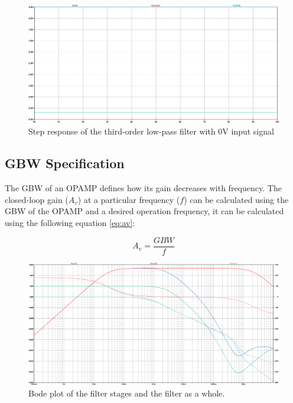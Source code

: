 \begin{figure}[H]
    \centering
    \includegraphics[width=1\linewidth]{images/step_vos2.png}
    \caption{Step response of the third-order low-pass filter with 0V input signal}
    \label{fig:step_vos}
\end{figure}

\subsection{GBW Specification}
The GBW of an OPAMP defines how its gain decreases with frequency. The closed-loop gain ($A_{v}$) at a particular frequency ($f$) can be calculated using the GBW of the OPAMP and a desired operation frequency, it can be calculated using the following equation \ref{eq:av}:

\begin{equation}
    A_{v} = \frac{GBW}{f}
    \label{eq:av}
\end{equation}

\begin{figure}[H]
    \centering
    \includegraphics[width=1\linewidth]{images/bode-stages.png}
    \caption{Bode plot of the filter stages and the filter as a whole.}
    \label{fig:bode-stages}
\end{figure}

